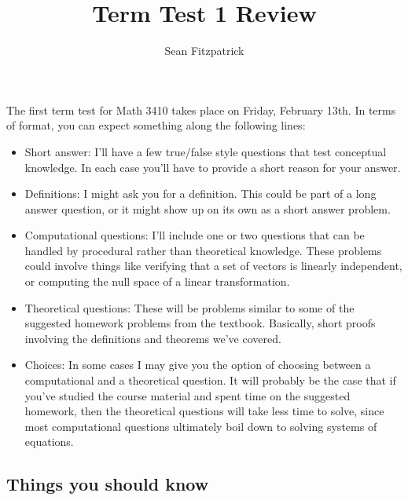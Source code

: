\documentclass[12pt,letterpaper]{article}
\author{Sean Fitzpatrick}
\title{Term Test 1 Review}
\begin{document}
\maketitle

The first term test for Math 3410 takes place on Friday, February 13th. In terms of format, you can expect something along the following lines:
\begin{itemize}
\item Short answer: I'll have a few true/false style questions that test conceptual knowledge. In each case you'll have to provide a short reason for your answer.
\item Definitions: I might ask you for a definition. This could be part of a long answer question, or it might show up on its own as a short answer problem.
\item Computational questions: I'll include one or two questions that can be handled by procedural rather than theoretical knowledge. These problems could involve things like verifying that a set of vectors is linearly independent, or computing the null space of a linear transformation.
\item Theoretical questions: These will be problems similar to some of the suggested homework problems from the textbook. Basically, short proofs involving the definitions and theorems we've covered.
\item Choices: In some cases I may give you the option of choosing between a computational and a theoretical question. It will probably be the case that if you've studied the course material and spent time on the suggested homework, then the theoretical questions will take less time to solve, since most computational questions ultimately boil down to solving systems of equations. 
\end{itemize}
\subsection*{Things you should know}
\end{document}
